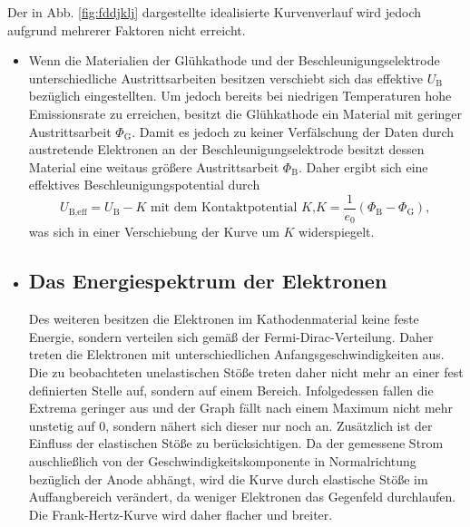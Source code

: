 Der in Abb. \ref{fig:fddjklj} dargestellte idealisierte Kurvenverlauf wird jedoch
aufgrund mehrerer Faktoren nicht erreicht.
\begin{itemize}
  \item {}
  Wenn die Materialien der Glühkathode und der Beschleunigungselektrode unterschiedliche
  Austrittsarbeiten besitzen verschiebt sich das effektive $U_\text{B}$ bezüglich
  eingestellten. Um jedoch bereits bei niedrigen Temperaturen hohe Emissionsrate
  zu erreichen, besitzt die Glühkathode ein Material mit geringer Austrittsarbeit $\Phi_\text{G}$.
  Damit es jedoch zu keiner Verfälschung der Daten durch austretende Elektronen an
  der Beschleunigungselektrode besitzt dessen Material eine weitaus größere Austrittsarbeit
  $\Phi_\text{B}$. Daher ergibt sich eine effektives Beschleunigungspotential durch
  \begin{equation}
    U_\text{B,eff} = U_\text{B} - K \text{ mit dem Kontaktpotential }K\text{,} K = \frac{1}{e_0}\left(\Phi_\text{B} - \Phi _\text{G} \right)\text{, }
  \end{equation}
was sich in einer Verschiebung der Kurve um $K$ widerspiegelt.

\item \subsection{Das Energiespektrum der Elektronen}
Des weiteren besitzen die Elektronen im Kathodenmaterial keine feste Energie, sondern
verteilen sich gemäß der Fermi-Dirac-Verteilung. Daher treten die Elektronen mit
unterschiedlichen Anfangsgeschwindigkeiten aus. Die zu beobachteten unelastischen Stöße treten
daher nicht mehr an einer fest definierten Stelle auf, sondern auf einem Bereich.
Infolgedessen fallen die Extrema geringer aus und der Graph fällt nach einem
Maximum nicht mehr unstetig auf 0, sondern nähert sich dieser nur noch an. Zusätzlich
ist der Einfluss der elastischen Stöße zu berücksichtigen. Da der gemessene
Strom auschließlich von der Geschwindigkeitskomponente in Normalrichtung bezüglich
der Anode abhängt, wird die Kurve durch elastische Stöße im Auffangbereich verändert,
da weniger Elektronen das Gegenfeld durchlaufen. Die Frank-Hertz-Kurve wird daher flacher und breiter.



\end{itemize}
